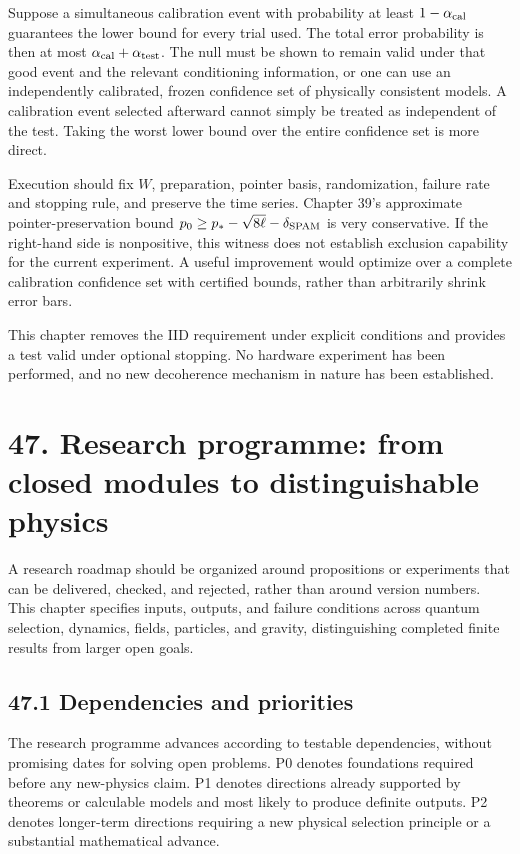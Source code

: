 \documentclass[
  11pt,
  oneside]{book}
\begin{document}
Suppose a simultaneous calibration event with probability at least
\(1-\alpha_{\rm cal}\) guarantees the lower bound for every trial used.
The total error probability is then at most
\(\alpha_{\rm cal}+\alpha_{\rm test}\). The null must be shown to remain
valid under that good event and the relevant conditioning information,
or one can use an independently calibrated, frozen confidence set of
physically consistent models. A calibration event selected afterward
cannot simply be treated as independent of the test. Taking the worst
lower bound over the entire confidence set is more direct.

Execution should fix \(W\), preparation, pointer basis, randomization,
failure rate and stopping rule, and preserve the time series. Chapter
39's approximate pointer-preservation bound
\(p_0\ge p_*-\sqrt{8\ell}-\delta_{\rm SPAM}\) is very conservative. If
the right-hand side is nonpositive, this witness does not establish
exclusion capability for the current experiment. A useful improvement
would optimize over a complete calibration confidence set with certified
bounds, rather than arbitrarily shrink error bars.

This chapter removes the IID requirement under explicit conditions and
provides a test valid under optional stopping. No hardware experiment
has been performed, and no new decoherence mechanism in nature has been
established.

\chapter{47. Research programme: from closed modules to distinguishable
physics}\label{ch-47}

A research roadmap should be organized around propositions or
experiments that can be delivered, checked, and rejected, rather than
around version numbers. This chapter specifies inputs, outputs, and
failure conditions across quantum selection, dynamics, fields,
particles, and gravity, distinguishing completed finite results from
larger open goals.

\section{47.1 Dependencies and priorities}

The research programme advances according to testable dependencies,
without promising dates for solving open problems. P0 denotes
foundations required before any new-physics claim. P1 denotes directions
already supported by theorems or calculable models and most likely to
produce definite outputs. P2 denotes longer-term directions requiring a
new physical selection principle or a substantial mathematical advance.
\end{document}

